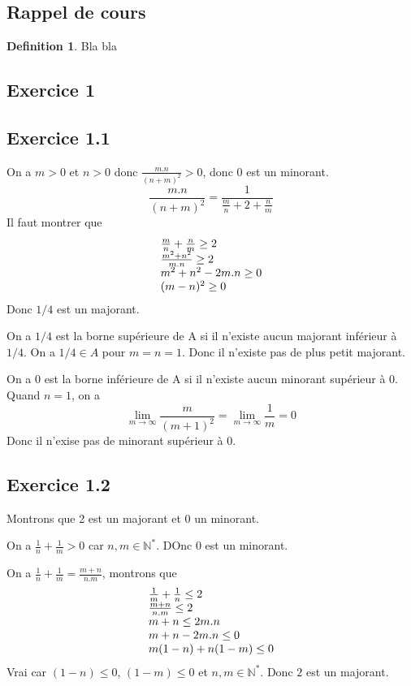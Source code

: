 \documentclass[]{book}
\theoremstyle{definition}
\newtheorem{defn}{Definition}
\newcommand{\bb}[1]{\mathbb{#1}}
\newcommand{\N}{\bb{N}}
\begin{document}
\subsection*{Rappel de cours}
\begin{defn}
Bla bla
\end{defn}



\newpage
\subsection*{Exercice 1}
\subsection*{Exercice 1.1}
On a $m > 0$ et $n >0$ donc $\frac{m.n}{(n+m)^2} > 0$, donc 0 est un minorant. 
$$
\frac{m.n}{(n+m)^2} = \frac{1}{\frac{m}{n}+2+\frac{n}{m}}
$$
Il faut montrer que 
$$
\begin{array}{l l}
\frac{m}{n}+\frac{n}{m} \geq 2 \\
\frac{m^2+n^2}{m.n} \geq 2 \\
m^2+n^2-2m.n \geq 0 \\
(m-n)^2 \geq 0 \\
\end{array}
$$
Donc $1/4$ est un majorant.

On a $1/4$ est la borne sup\'erieure de A si il n'existe aucun majorant inf\'erieur \`a $1/4$. On a $1/4 \in A$ pour $m=n=1$. Donc il n'existe pas de plus petit majorant.

On a 0 est la borne inf\'erieure de A si il n'existe aucun minorant sup\'erieur \`a $0$. Quand $n=1$, on a 
$$\lim_{m \to \infty}\frac{m}{(m+1)^2} = \lim_{m \to \infty}\frac{1}{m} = 0$$
Donc il n'exise pas de minorant sup\'erieur \`a 0.

\subsection*{Exercice 1.2}
Montrons que 2 est un majorant et 0 un minorant.

On a $\frac{1}{n}+\frac{1}{m}>0$ car $n,m \in \N^{*}$. DOnc 0 est un minorant.

On a $\frac{1}{n}+\frac{1}{m} = \frac{m+n}{n.m}$, montrons que 
$$
\begin{array}{l l}
\frac{1}{m} +  \frac{1}{n} \leq 2 \\
\frac{m+n}{n.m} \leq 2 \\
m+n \leq 2m.n \\
m+n-2m.n \leq 0 \\
m(1-n)+n(1-m) \leq 0 \\
\end{array}
$$
Vrai car $(1-n) \leq 0$, $(1-m) \leq 0$ et $n,m \in \N^{*}$. Donc $2$ est un majorant.
\end{document}
